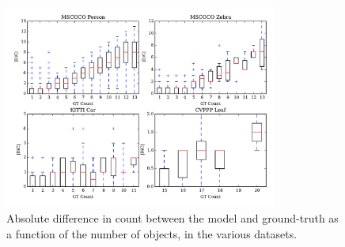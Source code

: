 \begin{figure}[h]
\centering
\includegraphics[width=0.8\textwidth]{count.pdf}
\caption{Absolute difference in count between the model and ground-truth as 
a function of the number of objects, in the various datasets.}
\label{fig:count}
\end{figure}
